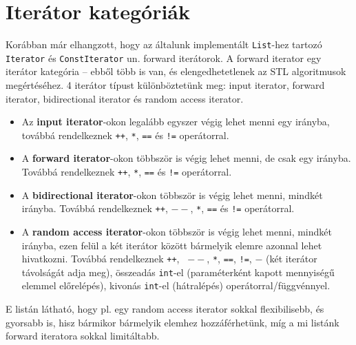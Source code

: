 \documentclass[../cpp_book/cpp_book.tex]{subfiles}
\begin{document}
	\section{Iterátor kategóriák}
	Korábban már elhangzott, hogy az általunk implementált \texttt{List}-hez tartozó \texttt{Iterator} és \texttt{ConstIterator} un. forward iterátorok. A forward iterator egy iterátor kategória -- ebből több is van, és elengedhetetlenek az STL algoritmusok megértéséhez. 4 iterátor típust különböztetünk meg: input iterator, forward iterator, bidirectional iterator és random access iterator.
	\begin{itemize}
		\item Az \textbf{input iterator}-okon legalább egyszer végig lehet menni egy irányba, továbbá rendelkeznek \texttt{++}, \texttt{*}, \texttt{==} és \texttt{!=} operátorral.
		\item A \textbf{forward iterator}-okon többször is végig lehet menni, de csak egy irányba. Továbbá rendelkeznek \texttt{++}, \texttt{*}, \texttt{==} és \texttt{!=} operátorral.
		\item A \textbf{bidirectional iterator}-okon többször is végig lehet menni, mindkét irányba. Továbbá rendelkeznek \texttt{++}, \texttt{$--$}, \texttt{*}, \texttt{==} és \texttt{!=} operátorral.
		\item A \textbf{random access iterator}-okon többször is végig lehet menni, mindkét irányba, ezen felül a két iterátor között bármelyik elemre azonnal lehet hivatkozni. Továbbá rendelkeznek \texttt{++}, \texttt{
		$--$}, \texttt{*}, \texttt{==}, \texttt{!=}, \texttt{$-$} (két iterátor távolságát adja meg), összeadás \texttt{int}-el (paraméterként kapott mennyiségű elemmel előrelépés), kivonás \texttt{int}-el (hátralépés) operátorral/függvénnyel.
	\end{itemize}
	E listán látható, hogy pl. egy random access iterator sokkal flexibilisebb, és gyorsabb is, hisz bármikor bármelyik elemhez hozzáférhetünk, míg a mi listánk forward iteratora sokkal limitáltabb.
	
\end{document}
